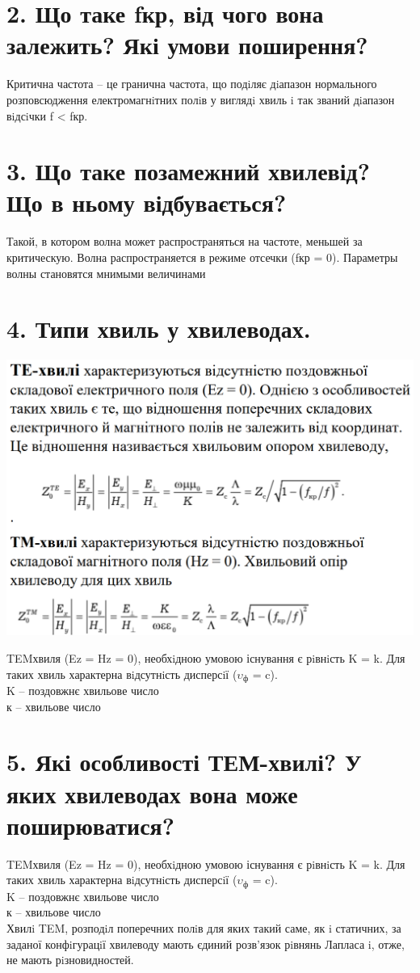 \documentclass[a4paper,14pt]{extreport}
\begin{document}
\section{2. Що таке fкр, від чого вона залежить? Які умови поширення?}
Критична частота – це гранична частота, що подiляє
дiапазон нормального розповсюдження електромагнiтних
полiв у виглядi хвиль i так званий дiапазон вiдсiчки f < fкр.

\section{3. Що таке позамежний хвилевід? Що в ньому відбувається?}
Такой, в котором волна может распространяться на частоте, меньшей за критическую. Волна распространяется в режиме отсечки (fкр = 0). Параметры волны становятся мнимыми величинами

\section{4. Типи хвиль у хвилеводах.}
\includegraphics[scale=0.58]{2.png}\par
TEMхвиля (Ez = Hz = 0), необхiдною умовою існування є рiвнiсть K = k.
Для таких хвиль характерна вiдсутнiсть дисперсiї ($\upsilon_{\text{ф}}$ = c).\\
K -- поздовжнє хвильове число\\
к -- хвильове число\\

\section{5. Які особливості ТЕМ-хвилі? У яких хвилеводах вона може поширюватися?}
TEMхвиля (Ez = Hz = 0), необхiдною умовою існування є рiвнiсть K = k.
Для таких хвиль характерна вiдсутнiсть дисперсiї ($\upsilon_{\text{ф}}$ = c).\\
K -- поздовжнє хвильове число\\
к -- хвильове число\\
Хвилi TEM, розподiл
поперечних полiв для яких такий саме, як i статичних, за заданої
конфiгурацiї хвилеводу мають єдиний розв'язок рiвнянь Лапласа i,
отже, не мають рiзновидностей.\\
\end{document}
